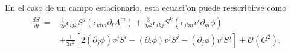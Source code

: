 %
En el caso de un campo estacionario, esta ecuaci'on puede reescribirse como 
\begin{align}
\frac{dS^i}{dt} =& \frac{1}{2c}\epsilon_{ijk}S^j\left(\epsilon_{klm}\partial_l A^m\right)+\frac{3}{2c^2}\epsilon_{ikj}S^k\left(\epsilon_{jlm}v^l\partial_m\phi\right)\nonumber\\
& +\frac{1}{2c^2}\left[2(\partial_j\phi)v^jS^i-(\partial_i\phi)v^jS^j -(\partial_j\phi)v^iS^j\right]+\mathcal{O}(G^2),\label{dlidt3}
\end{align}
